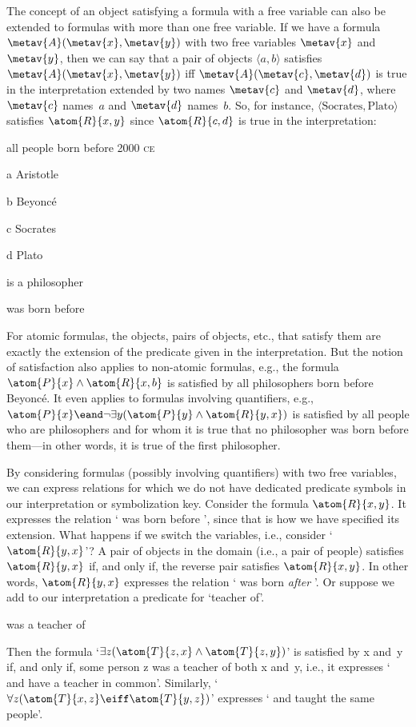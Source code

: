 The concept of an object satisfying a formula with a free variable can also be extended to formulas with more than one free variable. If we have a formula $\metav{A}(\metav{x},\metav{y})$ with two free variables $\metav{x}$ and $\metav{y}$, then we can say that a pair of objects $\langle a, b\rangle$ satisfies $\metav{A}(\metav{x},\metav{y})$ iff $\metav{A}(\metav{c},\metav{d})$ is true in the interpretation extended by two names $\metav{c}$ and $\metav{d}$, where $\metav{c}$ names~$a$ and $\metav{d}$ names~$b$. So, for instance, $\langle \text{Socrates}, \text{Plato}\rangle$ satisfies $\atom{R}{x,y}$ since $\atom{R}{c,d}$ is true in the interpretation:
\begin{ekey}
	\item[\text{domain}] all people born before 2000 \textsc{ce}
	\item[a] Aristotle
	\item[b] Beyonc\'e
	\item[c] Socrates
	\item[d] Plato
	\item[\atom{P}{x}]  is a philosopher
	\item[\atom{R}{x,y}]  was born before 
\end{ekey}
For atomic formulas, the objects, pairs of objects, etc., that satisfy them are exactly the extension of the predicate given in the interpretation. But the notion of satisfaction also applies to non-atomic formulas, e.g., the formula $\atom{P}{x} \land \atom{R}{x,b}$ is satisfied by all philosophers born before Beyonc\'e. It even applies to formulas involving quantifiers, e.g., $\atom{P}{x} \eand \lnot\exists y(\atom{P}{y} \land \atom{R}{y,x})$ is satisfied by all people who are philosophers and for whom it is true that no philosopher was born before them---in other words, it is true of the first philosopher.

By considering formulas (possibly involving quantifiers) with two free
variables, we can express relations for which we do not have dedicated
predicate symbols in our interpretation or symbolization key. Consider
the formula $\atom{R}{x,y}$. It expresses the relation ` was
born before ', since that is how we have specified its
extension. What happens if we switch the variables, i.e., consider
`$\atom{R}{y,x}$'?  A pair of objects  in
the domain (i.e., a pair of people) satisfies $\atom{R}{y,x}$ if, and only if,
the reverse pair  satisfies
$\atom{R}{x,y}$. In other words, $\atom{R}{y,x}$ expresses the
relation ` was born \emph{after} '. Or suppose we add to
our interpretation a predicate for `teacher of'.
\begin{ekey}
	\item[\atom{T}{x,y}]  was a teacher of 
\end{ekey}
Then the formula `$\exists z(\atom{T}{z,x} \land \atom{T}{z,y})$' is
satisfied by x and~y if, and only if, some person z was a teacher of
both x and~y, i.e., it expresses ` and  have a teacher
in common'. Similarly, `$\forall z(\atom{T}{x,z} \eiff \atom{T}{y,
z})$' expresses ` and  taught the same people'.

